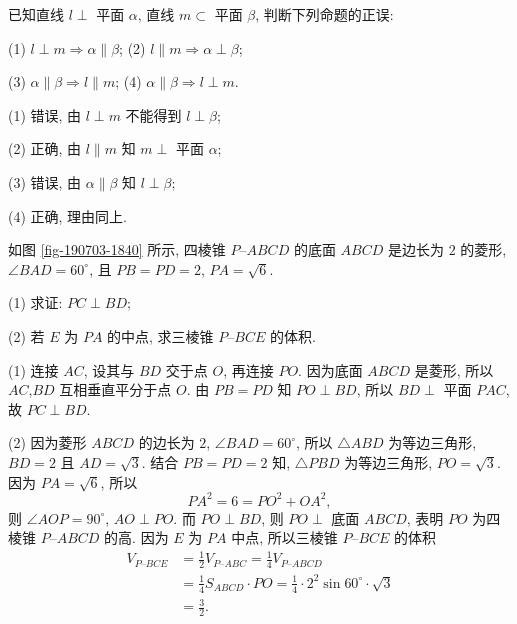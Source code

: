 \begin{exercise}
    已知直线 $l\perp$ 平面 $\alpha$, 直线 $m\subset$ 平面 $\beta$, 判断下列命题的正误:
    
    (1) $l\perp m\Rightarrow \alpha\parallel \beta$;\qquad 
    (2) $l\parallel m\Rightarrow \alpha\perp\beta$;
    
    (3) $\alpha\parallel \beta\Rightarrow l\parallel m$;\qquad
    (4) $\alpha\parallel \beta\Rightarrow l\perp m$.
\end{exercise}
\beginsolution
    (1) 错误, 由 $l\perp m$ 不能得到 $l\perp \beta$;

    (2) 正确, 由 $l\parallel m$ 知 $m\perp$ 平面 $\alpha$;

    (3) 错误, 由 $\alpha\parallel \beta$ 知 $l\perp \beta$;

    (4) 正确, 理由同上.
\endsolution

\begin{exercise}
    如图 \ref{fig-190703-1840} 所示, 四棱锥 $P\text{--}ABCD$ 的底面 $ABCD$ 是边长为 $2$ 的菱形, $\angle BAD= 60^\circ$, 且 $PB=PD=2$, $PA=\sqrt6$.
    
    (1) 求证: $PC\perp BD$;
    
    (2) 若 $E$ 为 $PA$ 的中点, 求三棱锥 $P\text{--}BCE$ 的体积.
\end{exercise}
\beginsolution
    (1) 连接 $AC$, 设其与 $BD$ 交于点 $O$, 再连接 $PO$. 因为底面 $ABCD$ 是菱形, 所以 $AC$,$BD$ 互相垂直平分于点 $O$. 由 $PB=PD$ 知 $PO\perp BD$, 所以 $BD\perp$ 平面 $PAC$, 故 $PC\perp BD$.

    (2) 因为菱形 $ABCD$ 的边长为 $2$, $\angle BAD= 60^\circ$, 所以 $\triangle ABD$ 为等边三角形, $BD=2$ 且 $AD=\sqrt3$. 结合 $PB=PD=2$ 知, $\triangle PBD$ 为等边三角形, $PO=\sqrt3$. 因为 $PA=\sqrt6$, 所以
    \[PA^2= 6= PO^2+OA^2,\]
    则 $\angle AOP= 90^\circ$, $AO\perp PO$. 而 $PO\perp BD$, 则 $PO\perp$ 底面 $ABCD$, 表明 $PO$ 为四棱锥 $P\text{--}ABCD$ 的高. 因为 $E$ 为 $PA$ 中点, 所以三棱锥 $P\text{--}BCE$ 的体积
    \[\begin{aligned}
        V_{P\text{--}BCE}
        &= \frac12 V_{P\text{--}ABC}
         = \frac14 V_{P\text{--}ABCD}\\
        &= \frac14 S_{ABCD}\cdot PO
         = \frac14\cdot 2^2 \sin 60^\circ\cdot \sqrt3\\
        &= \frac32.
    \end{aligned}\]
\endsolution

